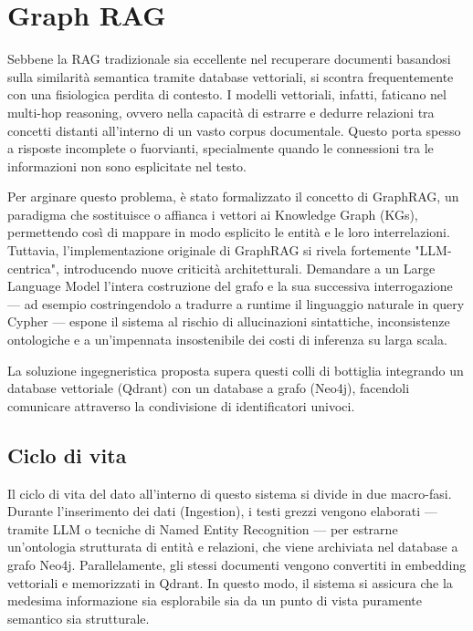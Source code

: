 \chapter{Graph RAG}

Sebbene la RAG tradizionale sia eccellente nel recuperare documenti basandosi sulla similarità semantica tramite database vettoriali,
si scontra frequentemente con una fisiologica perdita di contesto. I modelli vettoriali, infatti, faticano nel multi-hop reasoning,
ovvero nella capacità di estrarre e dedurre relazioni tra concetti distanti all'interno di un vasto corpus documentale.
Questo porta spesso a risposte incomplete o fuorvianti, specialmente quando le connessioni tra le informazioni non sono esplicitate nel testo.

Per arginare questo problema, è stato formalizzato il concetto di GraphRAG, un paradigma che sostituisce o affianca i vettori ai Knowledge Graph (KGs),
permettendo così di mappare in modo esplicito le entità e le loro interrelazioni. Tuttavia, l'implementazione originale di GraphRAG si rivela fortemente
"LLM-centrica", introducendo nuove criticità architetturali. Demandare a un Large Language Model l'intera costruzione del grafo e la sua successiva interrogazione —
ad esempio costringendolo a tradurre a runtime il linguaggio naturale in query Cypher — espone il sistema al rischio di allucinazioni sintattiche,
inconsistenze ontologiche e a un'impennata insostenibile dei costi di inferenza su larga scala.

La soluzione ingegneristica proposta supera questi colli di bottiglia integrando un database vettoriale (Qdrant) con un database a grafo (Neo4j),
facendoli comunicare attraverso la condivisione di identificatori univoci.

\section{Ciclo di vita}

\noindent
Il ciclo di vita del dato all'interno di questo sistema si divide in due macro-fasi. Durante l'inserimento dei dati (Ingestion),
i testi grezzi vengono elaborati — tramite LLM o tecniche di Named Entity Recognition — per estrarne un'ontologia strutturata di entità e relazioni,
che viene archiviata nel database a grafo Neo4j. Parallelamente, gli stessi documenti vengono convertiti in embedding vettoriali e memorizzati in Qdrant.
In questo modo, il sistema si assicura che la medesima informazione sia esplorabile sia da un punto di vista puramente semantico sia strutturale.


